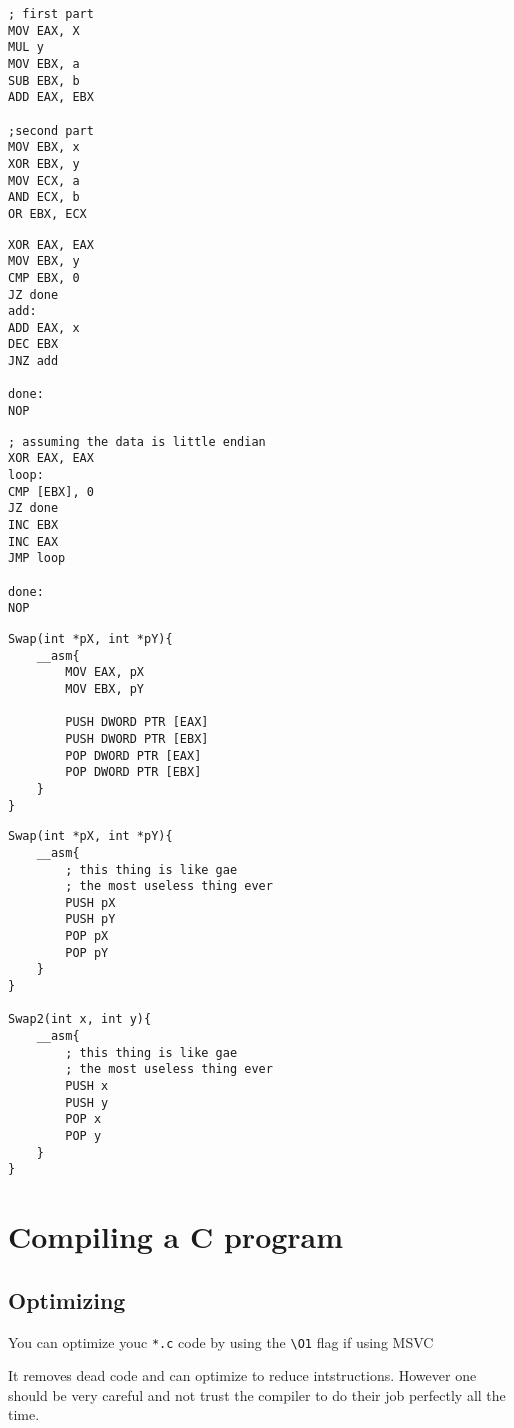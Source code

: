 \documentclass[11pt,letterpaper]{article}
\begin{document}

\begin{verbatim}
; first part
MOV EAX, X
MUL y
MOV EBX, a
SUB EBX, b
ADD EAX, EBX

;second part
MOV EBX, x
XOR EBX, y
MOV ECX, a
AND ECX, b
OR EBX, ECX
\end{verbatim}

\pagebreak
{}
\begin{verbatim}
XOR EAX, EAX
MOV EBX, y
CMP EBX, 0
JZ done
add:	
ADD EAX, x
DEC EBX
JNZ add

done:
NOP
\end{verbatim}
\begin{verbatim}
; assuming the data is little endian
XOR EAX, EAX
loop: 
CMP [EBX], 0
JZ done
INC EBX
INC EAX
JMP loop

done:
NOP
\end{verbatim}

\begin{verbatim}
Swap(int *pX, int *pY){
	__asm{
		MOV EAX, pX
		MOV EBX, pY

		PUSH DWORD PTR [EAX]
		PUSH DWORD PTR [EBX]
		POP DWORD PTR [EAX]
		POP DWORD PTR [EBX]
	}
}
\end{verbatim}

\pagebreak

\begin{verbatim}
Swap(int *pX, int *pY){
	__asm{
		; this thing is like gae
		; the most useless thing ever
		PUSH pX
		PUSH pY
		POP pX
		POP pY
	}
}

Swap2(int x, int y){
	__asm{
		; this thing is like gae
		; the most useless thing ever
		PUSH x 
		PUSH y 
		POP x
		POP y
	}
}
\end{verbatim}


\section*{Compiling a C program}
\subsection*{Optimizing}
You can optimize youc \texttt{*.c} code by using the \texttt{\textbackslash O1} flag if using MSVC

It removes dead code and can optimize to reduce intstructions. However one should
be very careful and not trust the compiler to do their job perfectly all the time.
\end{document}
